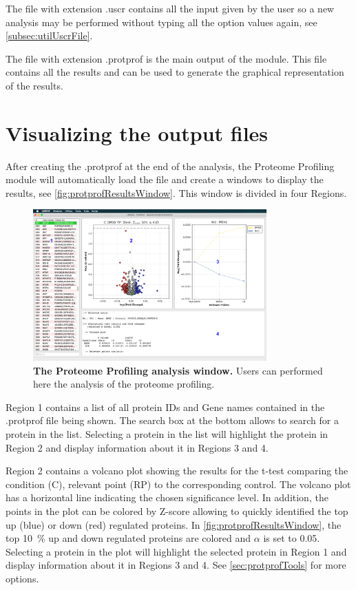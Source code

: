 The file with extension .uscr contains all the input given by the user so a new analysis may be performed without typing all the option values again, see \autoref{subsec:utilUscrFile}. 

The file with extension .protprof is the main output of the module. This file contains all the results and can be used to generate the graphical representation of the results.    

\section{Visualizing the output files}

After creating the .protprof at the end of the analysis, the Proteome Profiling module will automatically load the file and create a windows to display the results, see \autoref{fig:protprofResultsWindow}. This window is divided in four Regions. 

\begin{figure}[h]
	\centering
	\includegraphics[width=0.8\textwidth]{./IMAGES/MOD-PROTPROF/protprof-frag.jpg}	    
	\caption[The Proteome Profiling analysis window]{\textbf{The Proteome Profiling analysis window.} Users can performed here the analysis of the proteome profiling.} 
	\label{fig:protprofResultsWindow}
	\vspace{-5pt} 	
\end{figure}

Region \num{1} contains a list of all protein IDs and Gene names contained in the .protprof file being shown. The search box at the bottom allows to search for a protein in the list. Selecting a protein in the list will highlight the protein in Region \num{2} and display information about it in Regions \num{3} and \num{4}.

Region \num{2} contains a volcano plot showing the results for the t-test comparing the condition (C), relevant point (RP) to the corresponding control. The volcano plot has a horizontal line indicating the chosen significance level. In addition, the points in the plot can be colored by Z-score allowing to quickly identified the top up (blue) or down (red) regulated proteins. In \autoref{fig:protprofResultsWindow}, the top \SI{10}{\percent} up and down regulated proteins are colored and $\alpha$ is set to 0.05. Selecting a protein in the plot will highlight the selected protein in Region \num{1} and display information about it in Regions \num{3} and \num{4}. See \autoref{sec:protprofTools} for more options.

